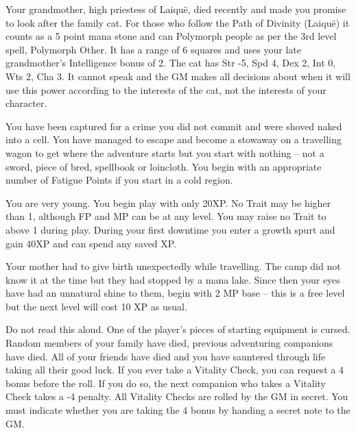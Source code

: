 \begin{list}{\addtocounter{list}{1}\textbf{:}}{\raggedleft}
\item{Your grandmother, high priestess of Laiqu\"{e}, died recently and made you promise to look after the family cat.  For those who follow the Path of Divinity (Laiqu\"{e}) it counts as a 5 point mana stone and can Polymorph people as per the 3rd level spell, Polymorph Other.  It has a range of 6 squares and uses your late grandmother's Intelligence bonus of 2.  The cat has Str -5, Spd 4, Dex 2, Int 0, Wts 2, Cha 3.  It cannot speak and the GM makes all decisions about when it will use this power according to the interests of the cat, not the interests of your character.}

\item{You have been captured for a crime you did not commit and were shoved naked into a cell.  You have managed to escape and become a stowaway on a travelling wagon to get where the adventure starts but you start with nothing -- not a sword, piece of bred, spellbook or loincloth.  You begin with an appropriate number of Fatigue Points if you start in a cold region.}

\item{ You are very young.  You begin play with only 20XP.  No Trait may be higher than 1, although FP and MP can be at any level.  You may raise no Trait to above 1 during play.  During your first downtime you enter a growth spurt and gain 40XP and can spend any saved XP. }

\item{ Your mother had to give birth unexpectedly while travelling.  The camp did not know it at the time but they had stopped by a mana lake.  Since then your eyes have had an unnatural shine to them, begin with 2 MP base -- this is a free level but the next level will cost 10 XP as usual. }

\item{ Do not read this aloud.  One of the player's pieces of starting equipment is cursed.  Random members of your family have died, previous adventuring companions have died.  All of your friends have died and you have sauntered through life taking all their good luck.  If you ever take a Vitality Check, you can request a 4 bonus before the roll.  If you do so, the next companion who takes a Vitality Check takes a -4 penalty.  All Vitality Checks are rolled by the GM in secret.  You must indicate whether you are taking the 4 bonus by handing a secret note to the GM. }


\end{list}
